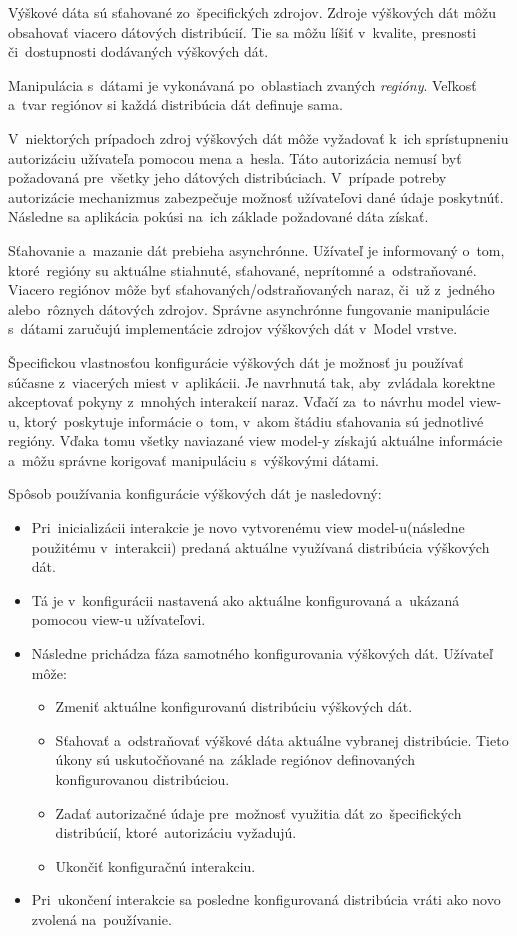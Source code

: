 Výškové dáta sú sťahované zo~špecifických zdrojov. Zdroje výškových dát môžu obsahovať viacero dátových distribúcií. Tie sa môžu líšiť v~kvalite, presnosti či~dostupnosti dodávaných výškových dát. 

Manipulácia s~dátami je vykonávaná po~oblastiach zvaných \textit{regióny}. Veľkosť a~tvar regiónov si každá distribúcia dát definuje sama. 

V~niektorých prípadoch zdroj výškových dát môže vyžadovať k~ich sprístupneniu autorizáciu užívateľa pomocou mena a~hesla. Táto autorizácia nemusí byť požadovaná pre~všetky jeho dátových distribúciach. V~prípade potreby autorizácie mechanizmus zabezpečuje možnosť užívateľovi dané údaje poskytnúť. Následne sa aplikácia pokúsi na~ich základe požadované dáta získať.   

Sťahovanie a~mazanie dát prebieha asynchrónne. Užívateľ je informovaný o~tom, ktoré~regióny su aktuálne stiahnuté, sťahované, neprítomné a~odstraňované. Viacero regiónov môže byť sťahovaných/odstraňovaných naraz, či~už z~jedného alebo~rôznych dátových zdrojov. Správne asynchrónne fungovanie manipulácie s~dátami zaručujú implementácie zdrojov výškových dát v~Model vrstve.

Špecifickou vlastnosťou konfigurácie výškových dát je možnosť ju používať súčasne z~viacerých miest v~aplikácii. Je navrhnutá tak, aby~zvládala korektne akceptovať pokyny z~mnohých interakcií naraz. Vďačí za~to návrhu model view-u, ktorý~poskytuje informácie o~tom, v~akom štádiu sťahovania sú jednotlivé regióny. Vďaka tomu všetky naviazané view model-y získajú aktuálne informácie a~môžu správne korigovať manipuláciu s~výškovými dátami.

Spôsob používania konfigurácie výškových dát je nasledovný:
\begin{itemize}
    \item Pri~inicializácii interakcie je novo vytvorenému view model-u(následne použitému v~interakcii) predaná aktuálne využívaná distribúcia výškových dát.
    \item Tá je v~konfigurácii nastavená ako aktuálne konfigurovaná a~ukázaná pomocou view-u užívateľovi.
    \item Následne prichádza fáza samotného konfigurovania výškových dát. Užívateľ môže:
    \begin{itemize}
        \item Zmeniť aktuálne konfigurovanú distribúciu výškových dát.
        \item Sťahovať a~odstraňovať výškové dáta aktuálne vybranej distribúcie. Tieto úkony sú uskutočňované na~základe regiónov definovaných konfigurovanou distribúciou.
        \item Zadať autorizačné údaje pre~možnosť využitia dát zo~špecifických distribúcií, ktoré~autorizáciu vyžadujú. 
        \item Ukončiť konfiguračnú interakciu.
    \end{itemize} 
    \item Pri~ukončení interakcie sa posledne konfigurovaná distribúcia vráti ako novo zvolená na~používanie.
\end{itemize}

